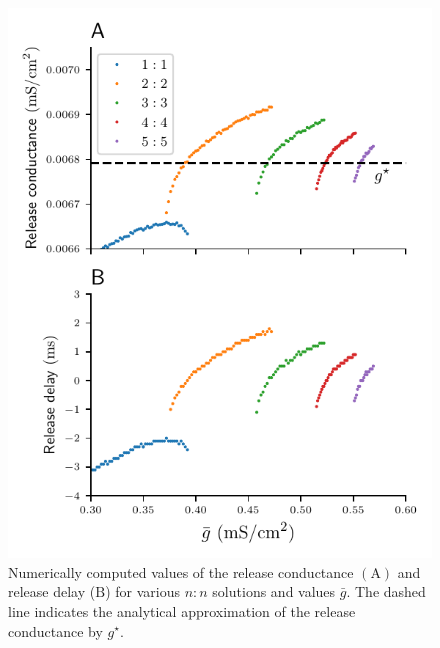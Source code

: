 \documentclass[utf8]{frontiersFPHY} %
\begin{document}
\begin{figure}[h!]
  \centering
  \includegraphics{gstar-diag}
  \caption{
    Numerically computed values of the release conductance $\bm{\mathrm{(A)}}$ and release delay ($\bm{\mathrm{B}}$) for various $n:n$ solutions and values $\bar g$. The dashed line indicates the analytical approximation of the release conductance by $g^{\star}$.\label{fig:gstar-diag}}
\end{figure}
\end{document}
